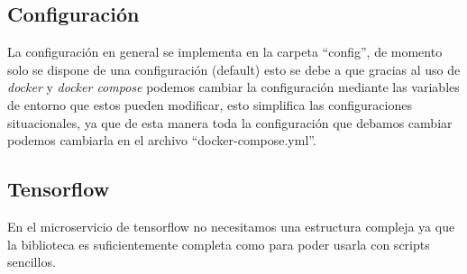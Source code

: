 \subsection{Configuración}
La configuración en general se implementa en la carpeta ``config'', de momento solo se dispone de una configuración (default) esto se debe a que gracias al uso de \emph{docker} y \emph{docker compose} podemos cambiar la configuración mediante las variables de entorno que estos pueden modificar, esto simplifica las configuraciones situacionales, ya que de esta manera toda la configuración que debamos cambiar podemos cambiarla en el archivo ``docker-compose.yml''.

\subsection{Tensorflow}
En el microservicio de tensorflow no necesitamos una estructura compleja ya que la biblioteca es suficientemente completa como para poder usarla con scripts sencillos.




